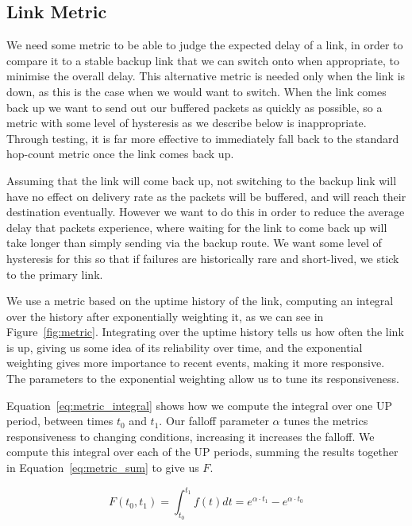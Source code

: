 \documentclass[withindex,glossary,openany]{cam-thesis}
\begin{document}
\subsection{Link Metric}

We need some metric to be able to judge the expected delay of a link, in order to compare it to a stable backup link that we can switch onto when appropriate, to minimise the overall delay. This alternative metric is needed only when the link is down, as this is the case when we would want to switch. When the link comes back up we want to send out our buffered packets as quickly as possible, so a metric with some level of hysteresis as we describe below is inappropriate. Through testing, it is far more effective to immediately fall back to the standard hop-count metric once the link comes back up.

Assuming that the link will come back up, not switching to the backup link will have no effect on delivery rate as the packets will be buffered, and will reach their destination eventually. However we want to do this in order to reduce the average delay that packets experience, where waiting for the link to come back up will take longer than simply sending via the backup route. We want some level of hysteresis for this so that if failures are historically rare and short-lived, we stick to the primary link.

We use a metric based on the uptime history of the link, computing an integral over the history after exponentially weighting it, as we can see in Figure~\ref{fig:metric}. Integrating over the uptime history tells us how often the link is up, giving us some idea of its reliability over time, and the exponential weighting gives more importance to recent events, making it more responsive. The parameters to the exponential weighting allow us to tune its responsiveness.

Equation~\ref{eq:metric_integral} shows how we compute the integral over one UP period, between times $t_0$ and $t_1$. Our falloff parameter $\alpha$ tunes the metrics responsiveness to changing conditions, increasing it increases the falloff. We compute this integral over each of the UP periods, summing the results together in Equation~\ref{eq:metric_sum} to give us $F$.

\begin{equation} \label{eq:metric_integral}
F(t_0, t_1) = \int_{t_0}^{t_1} f(t)dt = e^{\alpha \cdot t_1} - e^{\alpha \cdot t_0}
\end{equation}
\end{document}
